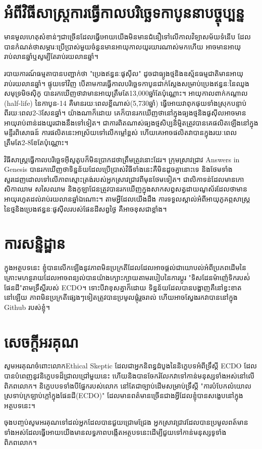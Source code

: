 \documentclass[10pt,twocolumn,letterpaper]{article}
\begin{document}
\section{អំពីវិធីសាស្ត្រការធ្វើកាលបរិច្ឆេទកាបូននាបច្ចុប្បន្ន}

មានមូលហេតុសំខាន់ៗជាច្រើនដែលធ្វើអោយយើងមិនមានជំនឿទៅលើកាលវិទ្យាសម័យទំនើប  ដែលបានកំណត់ថាសម្ភារៈប្រើប្រាស់មួយចំនួនមានអាយុកាលយូរយារណាស់មកហើយ អាចមានអាយុរាប់លានឆ្នាំឬសូម្បីតែរាប់រយលានឆ្នាំ។

របាយការណ៍ធម្មតាបានបញ្ជាក់ថា "ប្រេងឥន្ធនៈផូសុីល" ដូចជាធ្យូងថ្មនិងឧស្ម័នធម្មជាតិមានអាយុរាប់រយលានឆ្នាំ\cite{104}។ ផ្ទុយទៅវិញ បើតាមការធ្វើកាលបរិច្ឆេទកាបូនជាក់ស្តែងសម្រាប់ប្រេងឥន្ធនៈនៃឈូងសមុទ្រមិចស៊ិកូ បានរកឃើញថាវាមានអាយុត្រឹមតែ13,000ឆ្នាំតែប៉ុណ្ណោះ\cite{105}។ អាយុកាលពាក់កណ្តាល (half-life) នៃកាបូន-14 គឺមានរយៈពេលខ្លីណាស់(5,730ឆ្នាំ) ធ្វើអោយវាពុកផុយទាំងស្រុកបន្ទាប់ពីរយៈពេល2-3សែនឆ្នាំ។ យ៉ាងណាក៏ដោយ គេក៏បានរកឃើញថានៅក្នុងធ្យងថ្មនិងផូសុីលអាចមានអាយុរាប់ពាន់ដងយូរជាងនឹងទៅទៀត\cite{106}។ ជាការពិតណាស់ធ្យងថ្មសិប្បនិម្មិតត្រូវបានគេផលិតឡើងនៅក្នុងមន្ទីរពិសោធន៍ ការផលិតនេះអាស្រ័យទៅលើកម្តៅខ្ពស់ ហើយគេអាចផលិតវាបានក្នុងរយៈពេលត្រឹមតែ2-8ខែតែប៉ុណ្ណោះ\cite{107}។

វិធីសាស្ត្រធ្វើកាលបរិច្ឆេទអុីសូតូបក៏មិនប្រាកដថាត្រឹមត្រូវនោះដែរ។ ក្រុមស្រាវជ្រាវ Answers in Genesis បានរកឃើញថាទិន្នន័យដែលប្រើប្រាស់វិធីទាំងនេះគឺមិនដូចគ្នានោះទេ និងថែមទាំងសួរដេញដោលទៅលើភាពស្មោះត្រង់របស់អ្នកស្រាវជ្រាវពីមុនថែមទៀត\cite{108}។ ជាលិកាទន់ដែលមានកោសិកាឈាម សសៃឈាម និងកូឡាជែនត្រូវបានរកឃើញក្នុងសាកសព្វសត្វដាយណូស័រដែលថាមានអាយុរហូតដល់រាប់រយលានឆ្នាំឯណោះ\cite{109,110}។ តាមអ្វីដែលយើងដឹង ការទទួលស្គាល់អំពីអាយុភូគព្ភសាស្ត្រនៃថ្មនិងប្រេងឥន្ធនៈផូសុីលរបស់ផែនដីសព្វថ្ងៃ គឺអាចខុសជាខ្លាំង។ 

\section{ការសន្និដ្ឋាន}

ក្នុងអត្ថបទនេះ ខ្ញុំបានលើកឡើងនូវភាពមិនប្រក្រតីដែលដែលអាចផ្តល់ជាយោបល់អំពីប្រភពដើមនៃគ្រោះមហន្ថរាយដែលអាចពន្យល់បានយ៉ាងក្បោះក្បាយតាមរបៀបនៃការប្តូរ "ទិសដែនម៉ាញ៉េទិករបស់់ផែនដី"​តាមទ្រឹស្តីរបស់ ECDO។ ទោះបីវាខុសគ្នាក៏ដោយ ទិន្នន័យដែលបានបង្ហាញគឺនៅខ្វះខាតនៅឡើយ ភាពមិនប្រក្រតីផ្សេងៗទៀតត្រូវបានប្រមូលផ្តុំរួចរាល់ ហើយអាចស្វែងរកវាបាននៅក្នុង Github របស់ខ្ញុំ\cite{2}។
\section{សេចក្ដីអរគុណ}

សូមអរគុណចំពោះលោក​Ethical Skeptic ដែលជាអ្នកនិពន្ធដំបូងនៃនិក្ខេបទអំពីទ្រឹស្តី ECDO ដែលបានបំពេញនូវនិក្ខេបទដ៏ជ្រាលជ្រៅមួយនេះ ហើយនិងបានចែករំលែកវាទៅកាន់មនុស្សទាំងអស់នៅលើពិភពលោក។ និក្ខេបបទទាំងបីផ្នែករបស់លោក\cite{1} នៅតែជាច្បាប់ដើមសម្រាប់ទ្រឹស្តី "ការបំបែកលំយោលស្រទាប់ក្រឡាប់ក្តៅក្នុងផែនដី(ECDO)" ដែលមានពត៌មានច្រើនជាងអ្វីដែលខ្ញុំបានសង្ខេបនៅក្នុងអត្ថបទនេះ។

ចុងបញ្ចប់សូមអរគុណទៅដល់អ្នកដែលបានជួយជ្រោមជ្រែង អ្នកស្រាវជ្រាវដែលបានប្រមូលពត៍មានទាំងអស់ដែលធ្វើអោយយើងមានលទ្ធភាពបង្កើតអត្ថបទនេះដើម្បីជួយទៅកាន់មនុស្សទូទាំងពិភពលោក។

\clearpage
\twocolumn

{\small
\renewcommand{\refname}{ឯកសារយោង}


}
\end{document}

